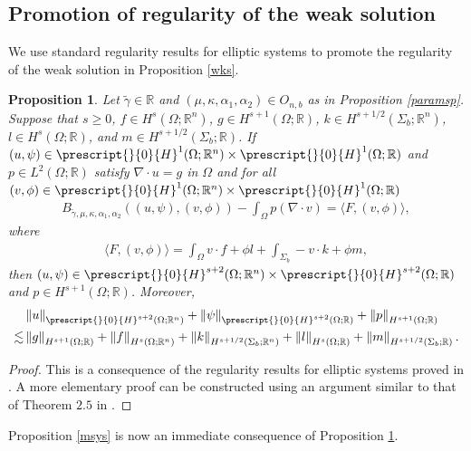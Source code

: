 \documentclass[11pt,letterpaper,reqno]{amsart}
\newtheorem{proposition}[theorem]{Proposition}
\numberwithin{equation}{section}
\newcommand{\norm}[1]{\left\lVert#1\right\rVert}
\begin{document}
\subsection{Promotion of regularity of the weak solution}
We use standard regularity results for elliptic systems to promote the regularity of the weak solution in Proposition \ref{wks}.
\begin{proposition} \label{classicalsoln}
    Let \(\widetilde{\gamma} \in \mathbb{R}\) and \((\mu,\kappa,\alpha_{1},\alpha_{2}) \in O_{n,b}\) as in Proposition \ref{paramsp}. Suppose that \(s \geq 0\), \(f \in H^{s}(\Omega;\mathbb{R}^{n})\), \(g \in H^{s+1}(\Omega;\mathbb{R})\), \(k \in H^{s+1/2}(\Sigma_{b};\mathbb{R}^{n})\), \(l \in H^{s}(\Omega;\mathbb{R})\), and \(m \in H^{s+1/2}(\Sigma_{b};\mathbb{R})\). If \((u,\psi) \in \prescript{}{0}{H}^{1}(\Omega;\mathbb{R}^{n}) \times \prescript{}{0}{H}^{1}(\Omega;\mathbb{R})\) and \(p \in L^{2}(\Omega;\mathbb{R})\) satisfy \(\nabla \cdot u = g\) in \(\Omega\) and for all \((v,\phi) \in \prescript{}{0}{H}^{1}(\Omega;\mathbb{R}^{n}) \times \prescript{}{0}{H}^{1}(\Omega;\mathbb{R})\)
    \begin{align}
        B_{\widetilde{\gamma},\mu,\kappa,\alpha_{1},\alpha_{2}}((u,\psi),(v,\phi))-\int_{\Omega}p(\nabla \cdot v) = \langle F, (v,\phi) \rangle,
    \end{align}
    where
    \begin{align}
        \langle F, (v,\phi) \rangle = \int_{\Omega}v \cdot f + \phi l +\int_{\Sigma_{b}}-v \cdot k+\phi m,
    \end{align}
    then \((u, \psi) \in \prescript{}{0}{H}^{s+2}(\Omega; \mathbb{R}^{n}) \times \prescript{}{0}{H}^{s+2}(\Omega;\mathbb{R})\) and \(p \in H^{s+1}(\Omega;\mathbb{R})\). Moreover,
    \begin{align}
        &\norm{u}_{\prescript{}{0}{H}^{s+2}(\Omega;\mathbb{R}^{n})}+\norm{\psi}_{\prescript{}{0}{H}^{s+2}(\Omega;\mathbb{R})}+\norm{p}_{H^{s+1}(\Omega;\mathbb{R})} \nonumber\\
        \lesssim& \norm{g}_{H^{s+1}(\Omega;\mathbb{R})}+\norm{f}_{H^{s}(\Omega;\mathbb{R}^{n})}+\norm{k}_{H^{s+1/2}(\Sigma_{b};\mathbb{R}^{n})}+\norm{l}_{H^{s}(\Omega;\mathbb{R})}+\norm{m}_{H^{s+1/2}(\Sigma_{b};\mathbb{R})}.
    \end{align}
\end{proposition}
\begin{proof}
    This is a consequence of the regularity results for elliptic systems proved in \cite{agmon1964estimates}. A more elementary proof can be constructed using an argument similar to that of Theorem \(2.5\) in \cite{leoni2021travelingwavesolutionsfree}.
\end{proof}
Proposition \ref{msys} is now an immediate consequence of Proposition \ref{classicalsoln}.
\end{document}

